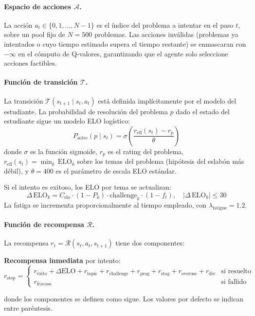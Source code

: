\documentclass[12pt, a4paper]{article}
\begin{document}
\paragraph{Espacio de acciones $\mathcal{A}$.}
La acción $a_t \in \{0, 1, \ldots, N-1\}$ es el índice del problema a intentar
en el paso $t$, sobre un pool fijo de $N = 500$ problemas. Las acciones
inválidas (problemas ya intentados o cuyo tiempo estimado supera el tiempo
restante) se enmascaran con $-\infty$ en el cómputo de Q-valores, garantizando
que el agente solo seleccione acciones factibles.
 
\paragraph{Función de transición $\mathcal{T}$.}
La transición $\mathcal{T}(s_{t+1} \mid s_t, a_t)$ está definida implícitamente
por el modelo del estudiante. La probabilidad de resolución del problema $p$
dado el estado del estudiante sigue un modelo ELO logístico:
\[
  P_{\text{solve}}(p \mid s_t) = \sigma\!\left(\frac{r_{\text{eff}}(s_t) - r_p}{\theta}\right)
\]
donde $\sigma$ es la función sigmoide, $r_p$ es el rating del problema,
$r_{\text{eff}}(s_t) = \min_k \,\text{ELO}_k$ sobre los temas del problema
(hipótesis del eslabón más débil), y $\theta = 400$ es el parámetro de escala
ELO estándar.
 
Si el intento es exitoso, los ELO por tema se actualizan:
\[
  \Delta\,\text{ELO}_k = C_{\text{elo}} \cdot (1 - P_k) \cdot \text{challenge}_k
  \cdot (1 - f_t),
  \quad |\Delta\,\text{ELO}_k| \leq 30
\]
La fatiga se incrementa proporcionalmente al tiempo empleado, con
$\lambda_{\text{fatigue}} = 1.2$.
 
\paragraph{Función de recompensa $\mathcal{R}$.}
La recompensa $r_t = \mathcal{R}(s_t, a_t, s_{t+1})$ tiene dos componentes:
 
\textbf{Recompensa inmediata} por intento:
\[
  r_{\text{step}} =
  \begin{cases}
    r_{\text{éxito}} + \overline{\Delta\text{ELO}} + r_{\text{topic}} +
    r_{\text{challenge}} + r_{\text{prog}} + r_{\text{stag}} +
    r_{\text{overuse}} + r_{\text{div}} & \text{si resuelto} \\
    r_{\text{fracaso}} & \text{si fallido}
  \end{cases}
\]
 
donde los componentes se definen como sigue. Los valores por defecto se
indican entre paréntesis.
 
\end{document}
